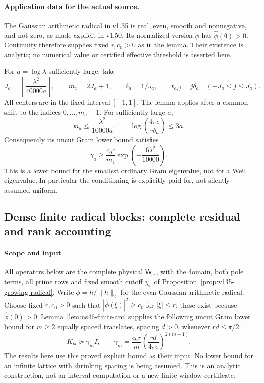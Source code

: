 \documentclass[11pt]{article}
\theoremstyle{remark}
\begin{document}
\paragraph{Application data for the actual source.}
The Gaussian arithmetic radical in v1.35 is real, even, smooth and
nonnegative, and not zero, as made explicit in v1.50. Its normalized
version $\phi$ has $\widehat\phi(0)>0$. Continuity therefore supplies
fixed $r,c_0>0$ as in the lemma. Their existence is analytic; no numerical
value or certified effective threshold is asserted here.

For $a=\log\lambda$ sufficiently large, take
\[
 J_a=\left\lfloor\frac{\lambda^2}{40000a}\right\rfloor,
 \qquad m_a=2J_a+1,\qquad \delta_a=1/J_a,
 \qquad t_{a,j}=j\delta_a\quad(-J_a\le j\le J_a).
\]
All centers are in the fixed interval $[-1,1]$.
The lemma applies after a common shift to the indices $0,\ldots,m_a-1$.
For sufficiently large $a$,
\[
 m_a\le\frac{\lambda^2}{10000a},\qquad
 \log\left(\frac{4\pi e}{r\delta_a}\right)\le3a.
\]
Consequently its uncut Gram lower bound satisfies
\begin{equation}\label{eq:ns46-gram-asymptotic}
 \gamma_a\ge\frac{c_0r}{m_a}
       \exp\left(-\frac{6\lambda^2}{10000}\right).
\end{equation}
This is a lower bound for the smallest ordinary Gram eigenvalue,
not for a Weil eigenvalue. In particular the conditioning is explicitly
paid for, not silently assumed uniform.


\subsection*{Dense finite radical blocks: complete residual and rank accounting}
\label{ns46-a2-sec-block}

\paragraph{Scope and input.}
All operators below are the complete physical $\mathsf W_{e^a}$,
with the domain, both pole terms, all prime rows and fixed smooth
cutoff $\chi_a$ of Proposition~\ref{prop:v135-growing-radical}.
Write $\phi=h/\|h\|_2$ for the even Gaussian arithmetic radical.
Choose fixed $r,c_0>0$ such that $|\widehat\phi(\xi)|^2\ge c_0$
for $|\xi|\le r$; these exist because $\widehat\phi(0)>0$.
Lemma~\ref{lem:ns46-finite-arc} supplies the following
uncut Gram lower bound for $m\ge2$ equally spaced translates,
spacing $d>0$, whenever $rd\le\pi/2$:
\begin{equation}\label{ns46-a2-eq-arc-input}
 K_m\succeq\gamma_m I,\qquad
 \gamma_m=\frac{c_0r}{m}
       \left(\frac{rd}{4\pi e}\right)^{2(m-1)}.
\end{equation}
The results here use this proved explicit bound as their input.
No lower bound for an infinite lattice with shrinking spacing is
being assumed. This is an analytic construction, not an interval
computation or a new finite-window certificate.
\end{document}
